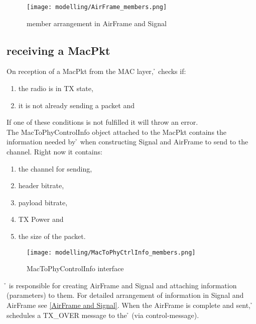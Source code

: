 \begin{figure}[H]
 \centering
 \texttt{[image: modelling/AirFrame\_members.png]}
 \caption{member arrangement in AirFrame and Signal}
 \label{fig: member AirFrame}
\end{figure}



\subsection{receiving a MacPkt}

On reception of a MacPkt from the MAC layer, \h{\bp} checks if:
\begin{enumerate}
	\item the radio is in TX state,
	\item it is not already sending a packet and
\end{enumerate} 

If one of these conditions is not fulfilled it will throw an error.\\

The MacToPhyControlInfo object attached to the MacPkt contains the information needed by \h{\bp} when constructing Signal and AirFrame to send to the channel. Right now it contains:

\begin{enumerate}
	\item the channel for sending,
	\item header bitrate,
	\item payload bitrate,
	\item TX Power and
	\item the size of the packet.

\end{enumerate}


\begin{figure}[H]
 \centering
 \texttt{[image: modelling/MacToPhyCtrlInfo\_members.png]}
 \caption{MacToPhyControlInfo interface}
 \label{fig: MacToPhyCtrlInfo interface}
\end{figure}

\h{\bp} is responsible for creating AirFrame and Signal and attaching information (parameters) to them. For detailed arrangement of information in Signal and AirFrame see \ref{AirFrame and Signal}.
When the AirFrame is complete and sent, \h{\bp} schedules a TX\_OVER message to the \h{\bm} (via control-message).

